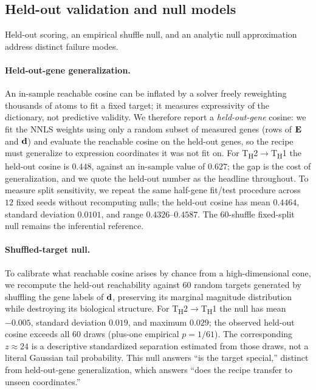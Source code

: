 \subsection{Held-out validation and null models}
\label{sec:methods-null}
Held-out scoring, an empirical shuffle null, and an analytic null approximation address
distinct failure modes.

\paragraph{Held-out-gene generalization.} An in-sample reachable cosine can be inflated by a
solver freely reweighting thousands of atoms to fit a fixed target; it measures expressivity
of the dictionary, not predictive validity. We therefore report a \emph{held-out-gene}
cosine: we fit the NNLS weights using only a random subset of measured genes (rows of
$\mathbf{E}$ and $\mathbf{d}$) and evaluate the reachable cosine on the held-out genes, so the recipe
must generalize to expression coordinates it was not fit on. For
T\textsubscript{H}2$\rightarrow$T\textsubscript{H}1 the held-out cosine is $0.448$, against an
in-sample value of $0.627$; the gap is the cost of generalization, and we quote the
held-out number as the headline throughout. To measure split sensitivity, we repeat the same
half-gene fit/test procedure across $12$ fixed seeds without recomputing nulls; the held-out
cosine has mean $0.4464$, standard deviation $0.0101$, and range $0.4326$--$0.4587$. The
$60$-shuffle fixed-split null remains the inferential reference.

\paragraph{Shuffled-target null.} To calibrate what reachable cosine arises by chance from a
high-dimensional cone, we recompute the held-out reachability against $60$ random targets
generated by shuffling the gene labels of $\mathbf{d}$, preserving its marginal magnitude
distribution while destroying its biological structure. For
T\textsubscript{H}2$\rightarrow$T\textsubscript{H}1 the null has mean $-0.005$, standard
deviation $0.019$, and maximum $0.029$; the observed held-out cosine exceeds all $60$ draws
(plus-one empirical $p=1/61$). The corresponding $z\approx24$ is a descriptive standardized
separation estimated from those draws, not a literal Gaussian tail probability. This null
answers ``is the target special,'' distinct from held-out-gene
generalization, which answers ``does the recipe transfer to unseen coordinates.''

